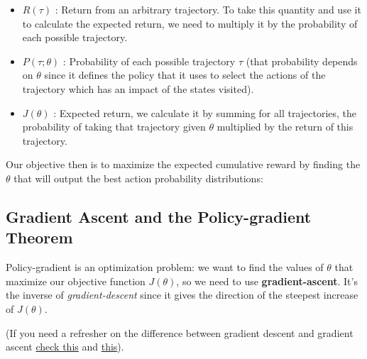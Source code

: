 \documentclass[11pt,a4paper]{article}
\begin{document}
\begin{itemize}
\item
  \(R(\tau)\) : Return from an arbitrary trajectory. To take this quantity and use it to calculate the expected return, we need to multiply it by the probability of each possible trajectory.
\item
  \(P(\tau;\theta)\) : Probability of each possible trajectory \(\tau\) (that probability depends on \(\theta\) since it defines the policy that it uses to select the actions of the trajectory which has an impact of the states visited).
\end{itemize}


\begin{itemize}
\tightlist
\item
  \(J(\theta)\) : Expected return, we calculate it by summing for all trajectories, the probability of taking that trajectory given \(\theta\) multiplied by the return of this trajectory.
\end{itemize}

Our objective then is to maximize the expected cumulative reward by finding the \(\theta\) that will output the best action probability distributions:


\subsection{Gradient Ascent and the Policy-gradient Theorem}\label{gradient-ascent-and-the-policy-gradient-theorem}

Policy-gradient is an optimization problem: we want to find the values of \(\theta\) that maximize our objective function \(J(\theta)\), so we need to use \textbf{gradient-ascent}. It's the inverse of \emph{gradient-descent} since it gives the direction of the steepest increase of \(J(\theta)\).

(If you need a refresher on the difference between gradient descent and gradient ascent \href{https://www.baeldung.com/cs/gradient-descent-vs-ascent}{check this} and \href{https://stats.stackexchange.com/questions/258721/gradient-ascent-vs-gradient-descent-in-logistic-regression}{this}).
\end{document}

